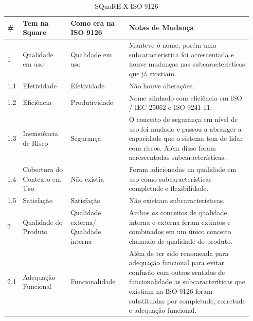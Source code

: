 \begin{longtable}{|p{12pt}|p{103pt}|p{135pt}|p{175pt}|}
 	\caption{SQuaRE X ISO 9126 \cite{iso_25010}}
 	 \label{Square_ISO}\\
 	\hline
 	 {\raggedright \textbf{\#}}
 	 & {\raggedright \textbf{Tem na Square}}
 	 & {\raggedright \textbf{Como era na ISO 9126}}
 	 & {\raggedright \textbf{Notas de Mudança}}\\
 	\hline
 	 {\raggedright 1}
 	 & {\raggedright Qualidade em uso }
 	 & {\raggedright Qualidade em uso}
 	 & {\raggedright Manteve o nome, porém uma subcaracteristica foi acrescentada e houve mudanças nas subcaracterísticas que já existiam.}\\
 	\hline
 	 {\raggedright 1.1}
 	 & {\raggedright Efetividade}
 	 & {\raggedright Efetividade}
 	 & {\raggedright Não houve alterações.}\\
 	\hline
 	 {\raggedright 1.2} 
 	 & {\raggedright Eficiência}
 	 & {\raggedright Produtividade}
	 & {\raggedright Nome alinhado com eficiência em ISO / IEC 25062 e ISO 9241-11.}\\
 	\hline
 	 {\raggedright 1.3}
 	 & {\raggedright Inexistência de Risco}
 	 & {\raggedright Segurança}
 	 & {\raggedright O conceito de segurança em nível de uso foi mudado e passou a abranger a capacidade que o sistema tem de lidar com riscos. Além disso foram acrescentadas subcaracterísticas.} \\
 	\hline
 	{\raggedright 1.4}
 	 & {\raggedright Cobertura do Contexto em Uso}
 	 & {\raggedright Não existia}
 	 & {\raggedright Foram adicionadas na qualidade em uso como subcaracterísticas completude e flexibilidade.} \\
 	\hline
 	{\raggedright 1.5}
 	 & {\raggedright Satisfação}
 	 & {\raggedright Satisfação}
 	 & {\raggedright Não existiam subcaracterísticas.} \\
 	\hline
 	{\raggedright 2}
 	 & {\raggedright Qualidade do Produto}
 	 & {\raggedright Qualidade externa/ Qualidade interna }
 	 & {\raggedright Ambos os conceitos de qualidade interna e externa foram extintos e combinados em um único conceito chamado de qualidade do produto.} \\
 	\hline
 	{\raggedright 2.1}
 	 & {\raggedright Adequação Funcional}
 	 & {\raggedright Funcionalidade}
 	 & {\raggedright Além de ter sido renomeada para adequação funcional para evitar confusão com outros sentidos de funcionalidade as subcaracteríticas que existiam na ISO 9126 foram substituídas por completude, corretude e adequação funcional.} \\

\end{longtable}
